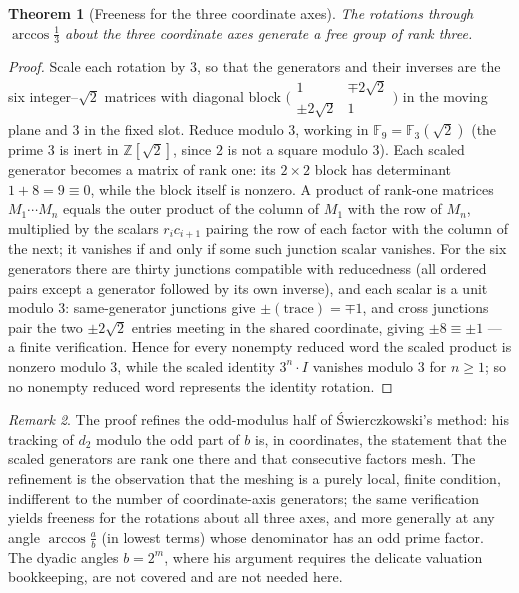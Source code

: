 \documentclass[11pt]{article}
\newtheorem{theorem}{Theorem}[section]
\theoremstyle{definition}
\theoremstyle{remark}
\newtheorem{remark}[theorem]{Remark}
\newcommand{\ZZ}{\mathbb{Z}}
\begin{document}
\begin{theorem}[Freeness for the three coordinate axes]\label{thm:rank3}
The rotations through $\arccos\frac13$ about the three coordinate axes generate a free group of rank three.
\end{theorem}

\begin{proof}
Scale each rotation by $3$, so that the generators and their inverses are the six integer--$\sqrt2$ matrices with diagonal block $\bigl(\begin{smallmatrix}1&\mp2\sqrt2\\\pm2\sqrt2&1\end{smallmatrix}\bigr)$ in the moving plane and $3$ in the fixed slot. Reduce modulo $3$, working in $\mathbb F_9=\mathbb F_3(\sqrt2)$ (the prime $3$ is inert in $\ZZ[\sqrt2]$, since $2$ is not a square modulo $3$). Each scaled generator becomes a matrix of rank one: its $2\times2$ block has determinant $1+8=9\equiv0$, while the block itself is nonzero. A product of rank-one matrices $M_1\cdots M_n$ equals the outer product of the column of $M_1$ with the row of $M_n$, multiplied by the scalars $r_i c_{i+1}$ pairing the row of each factor with the column of the next; it vanishes if and only if some such junction scalar vanishes. For the six generators there are thirty junctions compatible with reducedness (all ordered pairs except a generator followed by its own inverse), and each scalar is a unit modulo $3$: same-generator junctions give $\pm(\mathrm{trace})=\mp1$, and cross junctions pair the two $\pm2\sqrt2$ entries meeting in the shared coordinate, giving $\pm8\equiv\pm1$ --- a finite verification. Hence for every nonempty reduced word the scaled product is nonzero modulo $3$, while the scaled identity $3^n\cdot I$ vanishes modulo $3$ for $n\ge1$; so no nonempty reduced word represents the identity rotation.
\end{proof}

\begin{remark}
The proof refines the odd-modulus half of Świerczkowski's method: his tracking of $d_2$ modulo the odd part of $b$ \cite{Swierczkowski1994} is, in coordinates, the statement that the scaled generators are rank one there and that consecutive factors mesh. The refinement is the observation that the meshing is a purely local, finite condition, indifferent to the number of coordinate-axis generators; the same verification yields freeness for the rotations about all three axes, and more generally at any angle $\arccos\frac ab$ (in lowest terms) whose denominator has an odd prime factor. The dyadic angles $b=2^m$, where his argument requires the delicate valuation bookkeeping, are not covered and are not needed here.
\end{remark}
\end{document}
